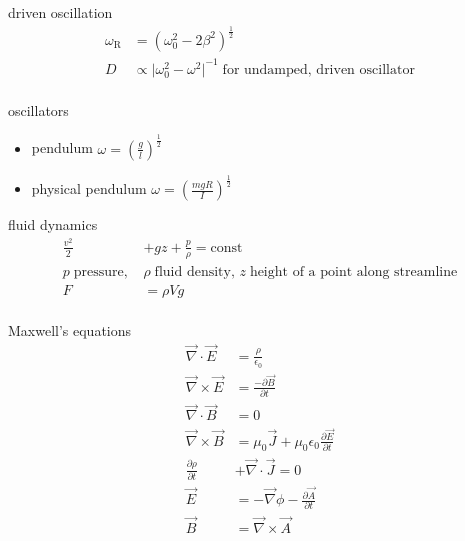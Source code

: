 \documentclass[avery5388, frame, grid]{flashcards}
\begin{document}
\begin{flashcard}{driven oscillation}
  {
    \begin{align*}
      \omega_{\textrm{R}} &= (\omega_{0}^{2} - 2 \beta^{2})^{\frac{1}{2}}\\
      D &\propto {\vert \omega_{0}^{2} - \omega^{2} \vert}^{-1} \; \textrm{for undamped, driven oscillator}\\
    \end{align*}
  }
\end{flashcard}

\begin{flashcard}{oscillators}
  {
    \begin{itemize}
    \item pendulum $\omega = (\frac{g}{l})^{\frac{1}{2}}$
    \item physical pendulum $\omega = (\frac{mgR}{I})^{\frac{1}{2}}$
    \end{itemize}
  }
\end{flashcard}

\begin{flashcard}{fluid dynamics}
  {
    \begin{align*}
      \frac{v^2}{2} &+ g z + \frac{p}{\rho} = \textrm{const}\\
      p \; \textrm{pressure, } &\rho \; \textrm{fluid density, } z \; \textrm{height of a point along streamline}\\
      F & = \rho V g\\
    \end{align*}
  }
\end{flashcard}

\begin{flashcard}{Maxwell's equations}
  {
    \begin{align*}
      \vec{\nabla} \cdot \vec{E} &= \frac{\rho}{\epsilon_{0}}\\
      \vec{\nabla} \times \vec{E} &= \frac{- \partial \vec{B}}{\partial t}\\
      \vec{\nabla} \cdot \vec{B} &= 0\\
      \vec{\nabla} \times \vec{B} &= \mu_{0} \vec{J} + \mu_{0} \epsilon_{0} \frac{\partial \vec{E}}{\partial t}\\
      \frac{\partial \rho}{\partial t} &+ \vec{\nabla} \cdot \vec{J} = 0\\
      \vec{E} &= - \vec{\nabla} \phi - \frac{\partial \vec{A}}{\partial t}\\
      \vec{B} &= \vec{\nabla} \times \vec{A}\\
    \end{align*}
  }
\end{flashcard}
\end{document}
